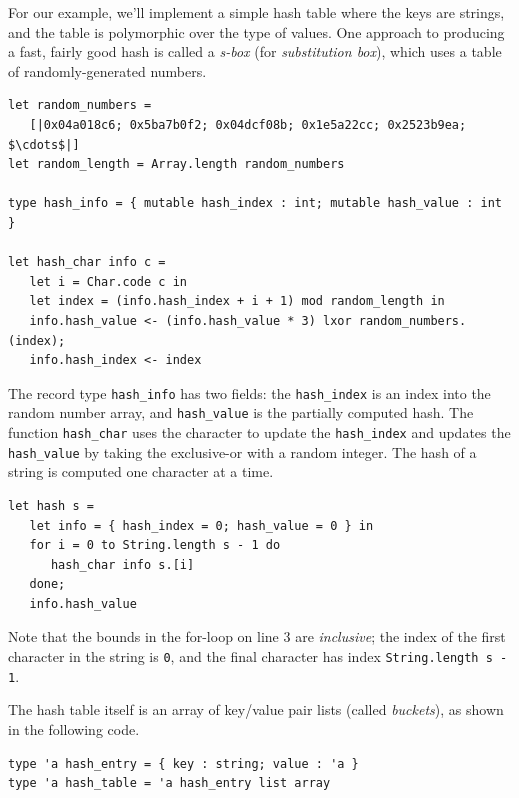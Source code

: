 For our example, we'll implement a simple hash table where the keys
are strings, and the table is polymorphic over the type of values.
One approach to producing a fast, fairly good hash is called
a \emph{s-box} (for \emph{substitution box}), which uses a table of
randomly-generated numbers.

\begin{ocamlblock}
\begin{ocamlblocksize}
\begin{lstlisting}[name=hash]
let random_numbers =
   [|0x04a018c6; 0x5ba7b0f2; 0x04dcf08b; 0x1e5a22cc; 0x2523b9ea; $\cdots$|]
let random_length = Array.length random_numbers

type hash_info = { mutable hash_index : int; mutable hash_value : int }

let hash_char info c =
   let i = Char.code c in
   let index = (info.hash_index + i + 1) mod random_length in
   info.hash_value <- (info.hash_value * 3) lxor random_numbers.(index);
   info.hash_index <- index
\end{lstlisting}
\end{ocamlblocksize}
%
The record type \hbox{\lstinline/hash_info/} has two fields:
the \hbox{\lstinline/hash_index/} is an index into the random number array,
and \hbox{\lstinline/hash_value/} is the partially computed hash.  The
function \hbox{\lstinline/hash_char/} uses the character to update
the \hbox{\lstinline/hash_index/} and updates the \hbox{\lstinline/hash_value/} by
taking the exclusive-or with a random integer.  The hash of a string
is computed one character at a time.

\begin{ocamlblocksize}
\begin{lstlisting}[name=hash]
let hash s =
   let info = { hash_index = 0; hash_value = 0 } in
   for i = 0 to String.length s - 1 do
      hash_char info s.[i]
   done;
   info.hash_value
\end{lstlisting}
\end{ocamlblocksize}
%
Note that the bounds in the for-loop on line 3 are \emph{inclusive};
the index of the first character in the string is \hbox{\lstinline/0/}, and
the final character has index \hbox{\lstinline/String.length s - 1/}.

The hash table itself is an array of key/value pair lists
(called \emph{buckets}), as shown in the following code.

\begin{ocamlblocksize}
\begin{lstlisting}[name=hash]
type 'a hash_entry = { key : string; value : 'a }
type 'a hash_table = 'a hash_entry list array


\end{lstlisting}
\end{ocamlblocksize}
\end{ocamlblock}
